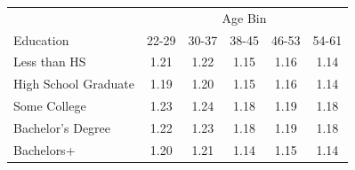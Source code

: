 \begin{tabular}{lccccc}
\hline\hline
 & \multicolumn{5}{c}{Age Bin} \\
Education & 22-29 & 30-37 & 38-45 & 46-53 & 54-61 \\
\hline
Less than HS&1.21&1.22&1.15&1.16&1.14\\
High School Graduate&1.19&1.20&1.15&1.16&1.14\\
Some College&1.23&1.24&1.18&1.19&1.18\\
Bachelor's Degree&1.22&1.23&1.18&1.19&1.18\\
Bachelors+&1.20&1.21&1.14&1.15&1.14\\
\hline\hline
\end{tabular}
